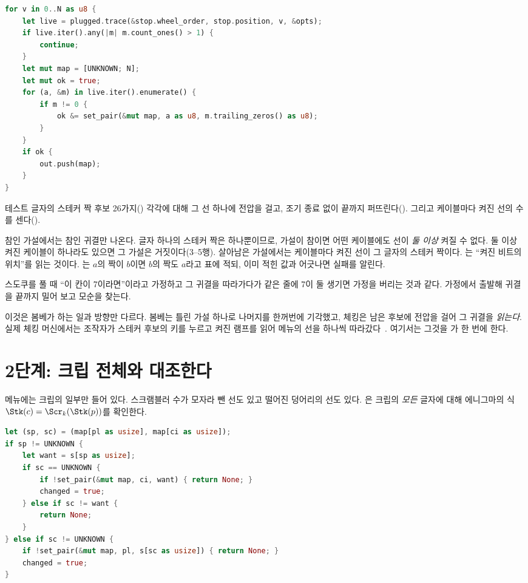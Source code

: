 \begin{lstlisting}[language=Rust,caption={\code{check.rs}: 스테커 가설(일부).}]
for v in 0..N as u8 {
    let live = plugged.trace(&stop.wheel_order, stop.position, v, &opts);
    if live.iter().any(|m| m.count_ones() > 1) {
        continue;
    }
    let mut map = [UNKNOWN; N];
    let mut ok = true;
    for (a, &m) in live.iter().enumerate() {
        if m != 0 {
            ok &= set_pair(&mut map, a as u8, m.trailing_zeros() as u8);
        }
    }
    if ok {
        out.push(map);
    }
}
\end{lstlisting}

테스트 글자의 스테커 짝 후보 26가지() 각각에 대해 그 선 하나에 전압을 걸고, 조기 종료 없이 끝까지
퍼뜨린다(). 그리고 케이블마다 켜진 선의 수를 센다().

\Why 참인 가설에서는 참인 귀결만 나온다. 글자 하나의 스테커 짝은 하나뿐이므로, 가설이 참이면 어떤 케이블에도
선이 \emph{둘 이상} 켜질 수 없다. 둘 이상 켜진 케이블이 하나라도 있으면 그 가설은 거짓이다(3--5행).
살아남은 가설에서는 케이블마다 켜진 선이 그 글자의 스테커 짝이다. 는 ``켜진 비트의
위치''를 읽는 것이다. 는 $a$의 짝이 $b$이면 $b$의 짝도 $a$라고 표에 적되, 이미 적힌 값과
어긋나면 실패를 알린다.

\General 스도쿠를 풀 때 ``이 칸이 7이라면''이라고 가정하고 그 귀결을 따라가다가 같은 줄에 7이 둘 생기면
가정을 버리는 것과 같다. 가정에서 출발해 귀결을 끝까지 밀어 보고 모순을 찾는다.

\Ours 이것은 봄베가 하는 일과 방향만 다르다. 봄베는 틀린 가설 하나로 나머지를 한꺼번에 기각했고, 체킹은
남은 후보에 전압을 걸어 그 귀결을 \emph{읽는다}. 실제 체킹 머신에서는 조작자가 스테커 후보의 키를 누르고
켜진 램프를 읽어 메뉴의 선을 하나씩 따라갔다~\cite[12--16]{us6812report1944}. 여기서는 그것을
가 한 번에 한다.

\section{2단계: 크립 전체와 대조한다}

메뉴에는 크립의 일부만 들어 있다. 스크램블러 수가 모자라 뺀 선도 있고 떨어진 덩어리의 선도 있다.
은 크립의 \emph{모든} 글자에 대해 에니그마의 식
$\Stk(c) = \Scr_k(\Stk(p))$를 확인한다.

\begin{lstlisting}[language=Rust,caption={\code{check.rs}: 크립 한 글자의 대조(일부).}]
let (sp, sc) = (map[pl as usize], map[ci as usize]);
if sp != UNKNOWN {
    let want = s[sp as usize];
    if sc == UNKNOWN {
        if !set_pair(&mut map, ci, want) { return None; }
        changed = true;
    } else if sc != want {
        return None;
    }
} else if sc != UNKNOWN {
    if !set_pair(&mut map, pl, s[sc as usize]) { return None; }
    changed = true;
}
\end{lstlisting}

